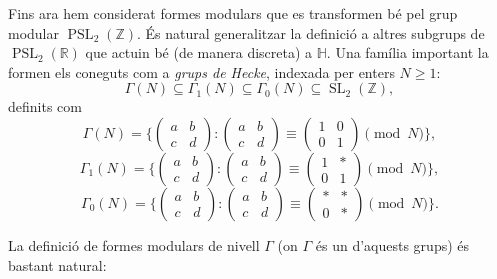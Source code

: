 \documentclass[
  letterpaper,
  DIV=11,
  numbers=noendperiod]{scrreprt}
\theoremstyle{plain}
\theoremstyle{plain}
\theoremstyle{definition}
\theoremstyle{plain}
\theoremstyle{plain}
\theoremstyle{definition}
\theoremstyle{remark}
\begin{document}
Fins ara hem considerat formes modulars que es transformen bé pel grup
modular \(\operatorname{PSL}_2(\mathbb{Z})\). És natural generalitzar la
definició a altres subgrups de \(\operatorname{PSL}_2(\mathbb{R})\) que
actuin bé (de manera discreta) a \(\mathbb{H}\). Una família important
la formen els coneguts com a \emph{grups de Hecke}, indexada per enters
\(N\geq 1\): \[
\Gamma(N)\subseteq \Gamma_1(N)\subseteq \Gamma_0(N)\subseteq \operatorname{SL}_2(\mathbb{Z}),
\] definits com \[
\Gamma(N) = \{ \left(\begin{smallmatrix}a&b\\c&d\end{smallmatrix}\right) : \left(\begin{smallmatrix}a&b\\c&d\end{smallmatrix}\right) \equiv \left(\begin{smallmatrix}1&0\\0&1\end{smallmatrix}\right) \pmod{N}\},
\] \[
\Gamma_1(N) = \{\left(\begin{smallmatrix}a&b\\c&d\end{smallmatrix}\right) : \left(\begin{smallmatrix}a&b\\c&d\end{smallmatrix}\right) \equiv \left(\begin{smallmatrix}1&*\\0&1\end{smallmatrix}\right) \pmod{N}\},
\] \[
\Gamma_0(N) = \{\left(\begin{smallmatrix}a&b\\c&d\end{smallmatrix}\right) : \left(\begin{smallmatrix}a&b\\c&d\end{smallmatrix}\right) \equiv \left(\begin{smallmatrix}*&*\\0&*\end{smallmatrix}\right) \pmod{N}\}.
\]

La definició de formes modulars de nivell \(\Gamma\) (on \(\Gamma\) és
un d'aquests grups) és bastant natural:
\end{document}
